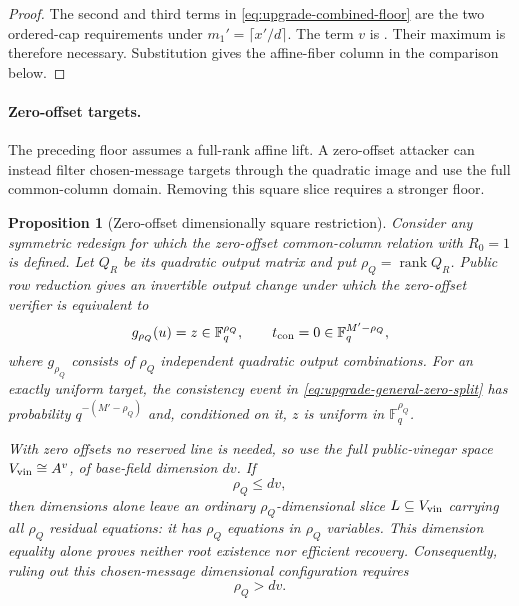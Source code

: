 \documentclass[11pt]{article}
\newtheorem{proposition}[proposition]{Proposition}
\newcommand{\F}{\mathbb F}
\newcommand{\rank}{\operatorname{rank}}
\begin{document}
\begin{proof}
The second and third terms in \eqref{eq:upgrade-combined-floor} are the two
ordered-cap requirements under $m_1'=\lceil x'/d\rceil$.  The term $v$ is
.  Their maximum is therefore necessary.
Substitution gives the affine-fiber column in the comparison below.
\end{proof}

\paragraph{Zero-offset targets.}
\label{sec:upgrade-zero-offset-repair}

The preceding floor assumes a full-rank affine lift.  A zero-offset attacker
can instead filter chosen-message targets through the quadratic image and use
the full common-column domain.  Removing this square slice requires a stronger
floor.

\begin{proposition}[Zero-offset dimensionally square restriction]
\label{prop:upgrade-zero-offset-square-persistence}
Consider any symmetric redesign for which the zero-offset common-column
relation with $R_0=1$ is defined.  Let $Q_R$ be its quadratic output matrix
and put $\rho_Q=\rank Q_R$.  Public row reduction gives an invertible output
change under which the zero-offset verifier is equivalent to
\begin{equation}
 g_{\rho_Q}(u)=z\in\F_q^{\rho_Q},
 \qquad
 t_{\rm con}=0\in\F_q^{M'-\rho_Q},                     \label{eq:upgrade-general-zero-split}
\end{equation}
where $g_{\rho_Q}$ consists of $\rho_Q$ independent quadratic output
combinations.  For an exactly uniform target, the consistency event in
\eqref{eq:upgrade-general-zero-split} has probability $q^{-(M'-\rho_Q)}$ and,
conditioned on it, $z$ is uniform in $\F_q^{\rho_Q}$.

With zero offsets no reserved line is needed, so use the full public-vinegar
space $V_{\rm vin}\cong A^v$, of base-field dimension $dv$.  If
\begin{equation}
 \rho_Q\le dv,                                          \label{eq:upgrade-zero-square-condition}
\end{equation}
then dimensions alone leave an ordinary $\rho_Q$-dimensional slice
$L\subseteq V_{\rm vin}$ carrying all $\rho_Q$ residual equations: it has
$\rho_Q$ equations in $\rho_Q$ variables.  This dimension equality alone
proves neither root existence nor efficient recovery.  Consequently, ruling
out this chosen-message dimensional configuration requires
\begin{equation}
 \rho_Q>dv.                                             \label{eq:upgrade-zero-square-rank-floor}
\end{equation}
\end{proposition}
\end{document}
